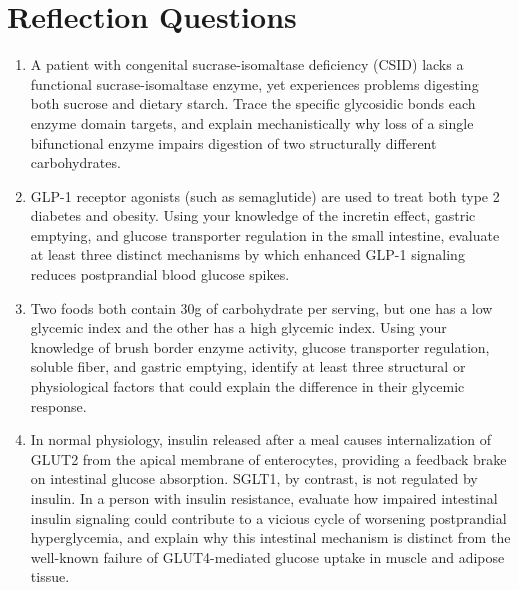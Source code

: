 \documentclass{tufte-handout}
\begin{document}

\section{Reflection Questions}
\begin{enumerate}
\item A patient with congenital sucrase-isomaltase deficiency (CSID) lacks a functional sucrase-isomaltase enzyme, yet experiences problems digesting both sucrose and dietary starch. Trace the specific glycosidic bonds each enzyme domain targets, and explain mechanistically why loss of a single bifunctional enzyme impairs digestion of two structurally different carbohydrates.
\item GLP-1 receptor agonists (such as semaglutide) are used to treat both type 2 diabetes and obesity. Using your knowledge of the incretin effect, gastric emptying, and glucose transporter regulation in the small intestine, evaluate at least three distinct mechanisms by which enhanced GLP-1 signaling reduces postprandial blood glucose spikes.
\item Two foods both contain 30g of carbohydrate per serving, but one has a low glycemic index and the other has a high glycemic index. Using your knowledge of brush border enzyme activity, glucose transporter regulation, soluble fiber, and gastric emptying, identify at least three structural or physiological factors that could explain the difference in their glycemic response.
\item In normal physiology, insulin released after a meal causes internalization of GLUT2 from the apical membrane of enterocytes, providing a feedback brake on intestinal glucose absorption. SGLT1, by contrast, is not regulated by insulin. In a person with insulin resistance, evaluate how impaired intestinal insulin signaling could contribute to a vicious cycle of worsening postprandial hyperglycemia, and explain why this intestinal mechanism is distinct from the well-known failure of GLUT4-mediated glucose uptake in muscle and adipose tissue.
\end{enumerate}



\end{document}
